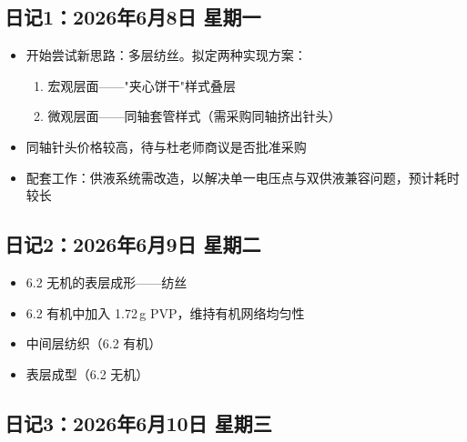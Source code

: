 \documentclass[a4paper, 12pt]{ctexart}
\begin{document}
\subsection*{日记1：2026年6月8日 \quad 星期一}

\begin{itemize}
  \item 开始尝试新思路：多层纺丝。拟定两种实现方案：
  \begin{enumerate}
    \item 宏观层面——"夹心饼干"样式叠层
    \item 微观层面——同轴套管样式（需采购同轴挤出针头）
  \end{enumerate}
  \item 同轴针头价格较高，待与杜老师商议是否批准采购
  \item 配套工作：供液系统需改造，以解决单一电压点与双供液兼容问题，预计耗时较长
\end{itemize}

\vspace{1.5cm}

\subsection*{日记2：2026年6月9日 \quad 星期二}

\begin{itemize}
  \item 6.2 无机的表层成形——纺丝
  \item 6.2 有机中加入 1.72\,g PVP，维持有机网络均匀性
  \item 中间层纺织（6.2 有机）
  \item 表层成型（6.2 无机）
\end{itemize}

\vspace{1.5cm}

\subsection*{日记3：2026年6月10日 \quad 星期三}
\end{document}

